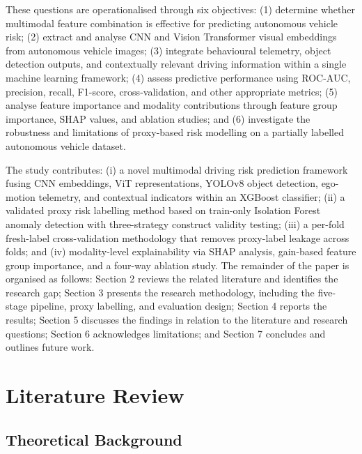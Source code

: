 \documentclass[11pt,a4paper]{article}
\begin{document}
These questions are operationalised through six objectives: (1) determine whether multimodal feature combination is effective for predicting autonomous vehicle risk; (2) extract and analyse CNN and Vision Transformer visual embeddings from autonomous vehicle images; (3) integrate behavioural telemetry, object detection outputs, and contextually relevant driving information within a single machine learning framework; (4) assess predictive performance using ROC-AUC, precision, recall, F1-score, cross-validation, and other appropriate metrics; (5) analyse feature importance and modality contributions through feature group importance, SHAP values, and ablation studies; and (6) investigate the robustness and limitations of proxy-based risk modelling on a partially labelled autonomous vehicle dataset.

The study contributes: (i) a novel multimodal driving risk prediction framework fusing CNN embeddings, ViT representations, YOLOv8 object detection, ego-motion telemetry, and contextual indicators within an XGBoost classifier; (ii) a validated proxy risk labelling method based on train-only Isolation Forest anomaly detection with three-strategy construct validity testing; (iii) a per-fold fresh-label cross-validation methodology that removes proxy-label leakage across folds; and (iv) modality-level explainability via SHAP analysis, gain-based feature group importance, and a four-way ablation study. The remainder of the paper is organised as follows: Section 2 reviews the related literature and identifies the research gap; Section 3 presents the research methodology, including the five-stage pipeline, proxy labelling, and evaluation design; Section 4 reports the results; Section 5 discusses the findings in relation to the literature and research questions; Section 6 acknowledges limitations; and Section 7 concludes and outlines future work.

\section{Literature Review}

\subsection{Theoretical Background}
\end{document}
